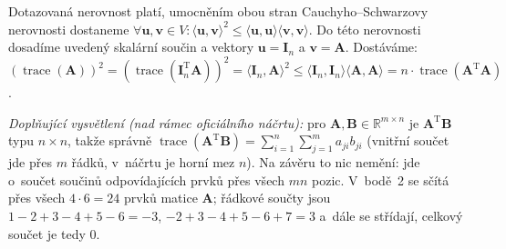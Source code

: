 \begin{enumerate}
    Dotazovaná nerovnost platí, umocněním obou stran Cauchyho--Schwarzovy nerovnosti dostaneme $\forall \mathbf{u}, \mathbf{v} \in V : \langle \mathbf{u}, \mathbf{v} \rangle^2 \le \langle \mathbf{u}, \mathbf{u} \rangle \langle \mathbf{v}, \mathbf{v} \rangle$. Do této nerovnosti dosadíme uvedený skalární součin a vektory $\mathbf{u} = \mathbf{I}_n$ a $\mathbf{v} = \mathbf{A}$.
    Dostáváme: $(\operatorname{trace}(\mathbf{A}))^2 = (\operatorname{trace}(\mathbf{I}_n^{\mathrm{T}} \mathbf{A}))^2 = \langle \mathbf{I}_n, \mathbf{A} \rangle^2 \le \langle \mathbf{I}_n, \mathbf{I}_n \rangle \langle \mathbf{A}, \mathbf{A} \rangle = n \cdot \operatorname{trace}(\mathbf{A}^{\mathrm{T}} \mathbf{A})$.
\end{enumerate}

\medskip
\noindent\textit{Doplňující vysvětlení (nad rámec oficiálního náčrtu):} pro $\mathbf{A},\mathbf{B}\in\mathbb{R}^{m\times n}$ je $\mathbf{A}^{\mathrm{T}}\mathbf{B}$ typu $n\times n$, takže správně $\operatorname{trace}(\mathbf{A}^{\mathrm{T}}\mathbf{B})=\sum_{i=1}^{n}\sum_{j=1}^{m}a_{ji}b_{ji}$ (vnitřní součet jde přes $m$ řádků, v~náčrtu je horní mez $n$). Na závěru to nic nemění: jde o~součet součinů odpovídajících prvků přes všech $mn$ pozic. V~bodě~2 se sčítá přes všech $4\cdot6=24$ prvků matice $\mathbf{A}$; řádkové součty jsou $1-2+3-4+5-6=-3$, $-2+3-4+5-6+7=3$ a~dále se střídají, celkový součet je tedy $0$.
